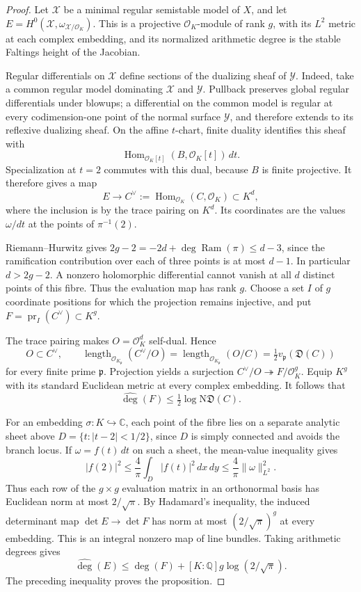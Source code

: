 \documentclass[11pt]{article}
\newcommand{\Q}{\mathbb Q}
\newcommand{\C}{\mathbb C}
\newcommand{\OK}{\mathcal O_K}
\begin{document}
\begin{proof}
Let $\mathcal X$ be a minimal regular semistable model of $X$, and
let $E=H^0(\mathcal X,\omega_{\mathcal X/\OK})$. This is a projective
$\OK$-module of rank $g$, with its $L^2$ metric at each complex
embedding, and its normalized arithmetic degree is the stable
Faltings height of the Jacobian.

Regular differentials on $\mathcal X$ define sections of the
dualizing sheaf of $\mathcal Y$. Indeed, take a common regular model
dominating $\mathcal X$ and $\mathcal Y$. Pullback preserves global
regular differentials under blowups; a differential on the common
model is regular at every codimension-one point of the normal
surface $\mathcal Y$, and therefore extends to its reflexive
dualizing sheaf. On the affine $t$-chart, finite duality identifies
this sheaf with
\[
 \operatorname{Hom}_{\OK[t]}(B,\OK[t])\,dt.
\]
Specialization at $t=2$ commutes with this dual, because $B$ is
finite projective. It therefore gives a map
\[
 E\longrightarrow C^\vee:=\operatorname{Hom}_{\OK}(C,\OK)
       \subset K^d,
\]
where the inclusion is by the trace pairing on $K^d$. Its coordinates
are the values $\omega/dt$ at the points of $\pi^{-1}(2)$.

Riemann--Hurwitz gives
$2g-2=-2d+\deg\operatorname{Ram}(\pi)\leq d-3$, since the
ramification contribution over each of three points is at most
$d-1$. In particular $d>2g-2$. A nonzero holomorphic differential
cannot vanish at all $d$ distinct points of this fibre. Thus the
evaluation map has rank $g$. Choose a set $I$ of $g$ coordinate
positions for which the projection remains injective, and put
$F=\operatorname{pr}_I(C^\vee)\subset K^g$.

The trace pairing makes $O=\OK^d$ self-dual. Hence
\[
 O\subset C^\vee,\qquad
 \operatorname{length}_{\OK_{\mathfrak p}}(C^\vee/O)
 =\operatorname{length}_{\OK_{\mathfrak p}}(O/C)
 =\tfrac12 v_{\mathfrak p}(\mathfrak D(C))
\]
for every finite prime $\mathfrak p$. Projection yields a surjection
$C^\vee/O\twoheadrightarrow F/\OK^g$. Equip $K^g$ with its standard
Euclidean metric at every complex embedding. It follows that
\[
 \widehat{\deg}(F)
 \leq \tfrac12\log\mathrm N\mathfrak D(C).
\]

For an embedding $\sigma:K\hookrightarrow\C$, each point of the
fibre lies on a separate analytic sheet above
$D=\{t:|t-2|<1/2\}$, since $D$ is simply connected and avoids the
branch locus. If $\omega=f(t)\,dt$ on such a sheet, the mean-value
inequality gives
\[
 |f(2)|^2\leq\frac4\pi\int_D|f(t)|^2\,dx\,dy
           \leq\frac4\pi\|\omega\|_{L^2}^2.
\]
Thus each row of the $g\times g$ evaluation matrix in an orthonormal
basis has Euclidean norm at most $2/\sqrt\pi$. By Hadamard's
inequality, the induced determinant map $\det E\to\det F$ has norm
at most $(2/\sqrt\pi)^g$ at every embedding. This is an integral
nonzero map of line bundles. Taking arithmetic degrees gives
\[
 \widehat{\deg}(E)
 \leq\widehat{\deg}(F)
       +[K:\Q]g\log(2/\sqrt\pi).
\]
The preceding inequality proves the proposition.
\end{proof}
\end{document}
